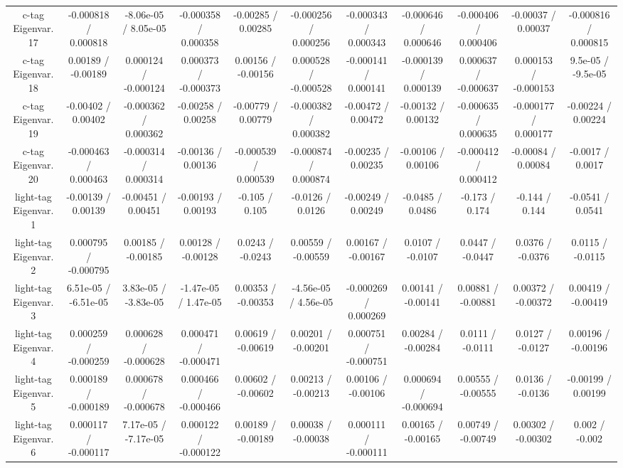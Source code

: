 \begin{table}[htbp]
\begin{center}
\begin{tabular}{|c|c|c|c|c|c|c|c|c|c|c|}
  c-tag Eigenvar. 17 & -0.000818 / 0.000818 & -8.06e-05 / 8.05e-05 & -0.000358 / 0.000358 & -0.00285 / 0.00285 & -0.000256 / 0.000256 & -0.000343 / 0.000343 & -0.000646 / 0.000646 & -0.000406 / 0.000406 & -0.00037 / 0.00037 & -0.000816 / 0.000815 \\ 
  c-tag Eigenvar. 18 & 0.00189 / -0.00189 & 0.000124 / -0.000124 & 0.000373 / -0.000373 & 0.00156 / -0.00156 & 0.000528 / -0.000528 & -0.000141 / 0.000141 & -0.000139 / 0.000139 & 0.000637 / -0.000637 & 0.000153 / -0.000153 & 9.5e-05 / -9.5e-05 \\ 
  c-tag Eigenvar. 19 & -0.00402 / 0.00402 & -0.000362 / 0.000362 & -0.00258 / 0.00258 & -0.00779 / 0.00779 & -0.000382 / 0.000382 & -0.00472 / 0.00472 & -0.00132 / 0.00132 & -0.000635 / 0.000635 & -0.000177 / 0.000177 & -0.00224 / 0.00224 \\ 
  c-tag Eigenvar. 20 & -0.000463 / 0.000463 & -0.000314 / 0.000314 & -0.00136 / 0.00136 & -0.000539 / 0.000539 & -0.000874 / 0.000874 & -0.00235 / 0.00235 & -0.00106 / 0.00106 & -0.000412 / 0.000412 & -0.00084 / 0.00084 & -0.0017 / 0.0017 \\ 
  light-tag Eigenvar. 1 & -0.00139 / 0.00139 & -0.00451 / 0.00451 & -0.00193 / 0.00193 & -0.105 / 0.105 & -0.0126 / 0.0126 & -0.00249 / 0.00249 & -0.0485 / 0.0486 & -0.173 / 0.174 & -0.144 / 0.144 & -0.0541 / 0.0541 \\ 
  light-tag Eigenvar. 2 & 0.000795 / -0.000795 & 0.00185 / -0.00185 & 0.00128 / -0.00128 & 0.0243 / -0.0243 & 0.00559 / -0.00559 & 0.00167 / -0.00167 & 0.0107 / -0.0107 & 0.0447 / -0.0447 & 0.0376 / -0.0376 & 0.0115 / -0.0115 \\ 
  light-tag Eigenvar. 3 & 6.51e-05 / -6.51e-05 & 3.83e-05 / -3.83e-05 & -1.47e-05 / 1.47e-05 & 0.00353 / -0.00353 & -4.56e-05 / 4.56e-05 & -0.000269 / 0.000269 & 0.00141 / -0.00141 & 0.00881 / -0.00881 & 0.00372 / -0.00372 & 0.00419 / -0.00419 \\ 
  light-tag Eigenvar. 4 & 0.000259 / -0.000259 & 0.000628 / -0.000628 & 0.000471 / -0.000471 & 0.00619 / -0.00619 & 0.00201 / -0.00201 & 0.000751 / -0.000751 & 0.00284 / -0.00284 & 0.0111 / -0.0111 & 0.0127 / -0.0127 & 0.00196 / -0.00196 \\ 
  light-tag Eigenvar. 5 & 0.000189 / -0.000189 & 0.000678 / -0.000678 & 0.000466 / -0.000466 & 0.00602 / -0.00602 & 0.00213 / -0.00213 & 0.00106 / -0.00106 & 0.000694 / -0.000694 & 0.00555 / -0.00555 & 0.0136 / -0.0136 & -0.00199 / 0.00199 \\ 
  light-tag Eigenvar. 6 & 0.000117 / -0.000117 & 7.17e-05 / -7.17e-05 & 0.000122 / -0.000122 & 0.00189 / -0.00189 & 0.00038 / -0.00038 & 0.000111 / -0.000111 & 0.00165 / -0.00165 & 0.00749 / -0.00749 & 0.00302 / -0.00302 & 0.002 / -0.002 \\ 

\end{tabular}
\end{center}
\end{table}
